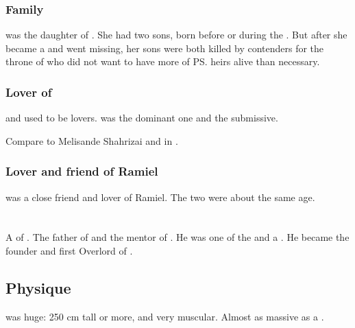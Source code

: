 \subsubsection{Family}
\Shiaraid{} was the daughter of . 
She had two sons, born before or during the \secondbanewar. 
But after she became a \malach{} and went missing, her sons were both killed by contenders for the throne of \Mystraacht{} who did not want to have more of \ps{\Zachirah} heirs alive than necessary. 





\subsubsection{Lover of \Aryal}
\Shiaraid{} and \Aryal{} used to be lovers. 
\Shiaraid{} was the dominant one and \Aryal{} the submissive. 

Compare to Melisande Shahrizai and \Phedre{} in . 





\subsubsection{Lover and friend of Ramiel}
\Shiaraid{} was a close friend and lover of Ramiel. 
The two were about the same age. 















\section{\Zachirah}
\index{\Zachirah}
A \resphan{} of .
The father of  and the mentor of . 
He was one of the  and a . 
He became the founder and first Overlord of . 








\subsection{Physique}
\Zachirah{} was huge: 
250 cm tall or more, and very muscular. 
Almost as massive as a \nephil. 

